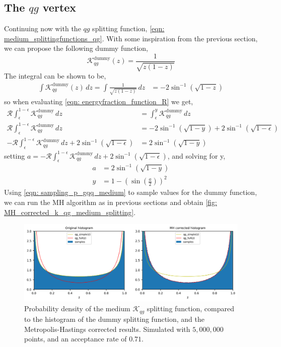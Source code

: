 \documentclass[main.tex]{subfiles}
\begin{document}
\subsection*{The \(qg\) vertex}
Continuing now with the \(qg\) splitting function, \autoref{eqn: medium_splittingfunctions_qg}. With some inspiration from the previous section, we can propose the following dummy function,
\begin{equation}
    \mathcal{K}_{qg}^{\text{dummy}}(z) = \frac{1}{\sqrt{z (1-z)}}
\end{equation}
The integral can be shown to be, 
\begin{align}
    \int \mathcal{K}_{qg}^{\text{dummy}}(z) \, dz = \int \frac{1}{\sqrt{z(1-z)}}\, dz &= -2 \sin^{-1}(\sqrt{1-z})
\end{align}
so when evaluating \autoref{eqn: energyfraction_function_R} we get,
\begin{align}
    \mathcal{R} \int_\epsilon^{1-\epsilon} \mathcal{K}_{qg}^{\text{dummy}} \,dz  &= \int_\epsilon^{y} \mathcal{K}_{qg}^{\text{dummy}} \,dz  \nonumber\\
    \mathcal{R} \int_\epsilon^{1-\epsilon} \mathcal{K}_{qg}^{\text{dummy}} \,dz &= -2 \sin^{-1}(\sqrt{1-y}) + 2 \sin^{-1}(\sqrt{1-\epsilon}) \nonumber\\
    -\mathcal{R} \int_\epsilon^{1-\epsilon} \mathcal{K}_{qg}^{\text{dummy}} \,dz + 2 \sin^{-1}(\sqrt{1-\epsilon}) &= 2 \sin^{-1}(\sqrt{1-y}) 
\end{align}
setting \(a = -\mathcal{R} \int_\epsilon^{1-\epsilon} \mathcal{K}_{qg}^{\text{dummy}} \,dz + 2 \sin^{-1}(\sqrt{1-\epsilon})\), and solving for y, 
\begin{align}\label{eqn: sampling_p_gqq_medium}
    a &= 2 \sin^{-1}(\sqrt{1-y}) \nonumber\\
    y &= 1- \left(\sin (\frac{a}{2})\right)^2
\end{align}
Using \autoref{eqn: sampling_p_gqq_medium} to sample values for the dummy function, we can run the MH algorithm as in previous sections and obtain \autoref{fig: MH_corrected_k_qg_medium_splitting}.
\begin{figure}[htb]
    \centering
    \includegraphics[width=15cm]{pictures/plots/Metropolis-Hastings/MH_medium_qg.png}
    \caption{Probability density of the medium \(\mathcal{K}_{qg}\) splitting function, compared to the histogram of the dummy splitting function, and the Metropolis-Hastings corrected results. Simulated with \(5,000,000\) points, and an acceptance rate of \(0.71\).}
    \label{fig: MH_corrected_k_qg_medium_splitting}
\end{figure}
\end{document}
